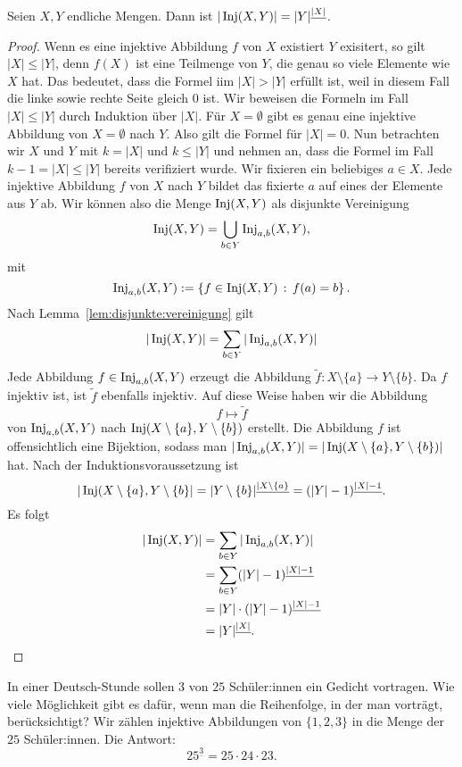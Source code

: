 \begin{thm} \label{thm:inj:abbildungen}
	Seien $X,Y$ endliche Mengen. Dann ist $|\operatorname{Inj}(X,Y) | = |Y|^{\underline{|X|}}$. 
\end{thm} 
\begin{proof} 
	Wenn es eine injektive Abbildung $f$ von $X$ existiert $Y$ exisitert, so gilt $|X| \le |Y|$, denn $f(X)$ ist eine Teilmenge von $Y$, die genau so viele Elemente wie $X$ hat. Das bedeutet, dass die Formel iim $|X| > |Y|$ erfüllt ist, weil in diesem Fall die linke sowie rechte Seite gleich $0$ ist. Wir beweisen die Formeln im Fall $|X| \le |Y|$ durch Induktion über $|X|$. Für $X = \emptyset$ gibt es genau eine injektive Abbildung von $X= \emptyset$ nach $Y$. Also gilt die Formel für $|X|=0$. 
	Nun betrachten wir $X$ und $Y$ mit $k=|X|$ und $k \le |Y|$ und nehmen an, dass die Formel im Fall $k-1=|X| \le |Y|$ bereits verifiziert wurde. Wir fixieren ein beliebiges $a \in X$. Jede injektive Abbildung $f$ von $X$ nach $Y$ bildet das fixierte $a$ auf eines der Elemente aus $Y$ ab. Wir können also die Menge $\operatorname{Inj}(X,Y)$ als disjunkte Vereinigung 
	\[
			\operatorname{Inj}(X,Y) = \bigcup_{b \in Y} \operatorname{Inj}_{a,b}(X,Y),
	\]
	mit 
	\[
		\operatorname{Inj}_{a,b} (X,Y) := \left\{  f \in \operatorname{Inj}(X,Y) \,:\, f(a) = b \right\}. 
	\]
	Nach Lemma~\ref{lem:disjunkte:vereinigung} gilt 
	\[
			|\operatorname{Inj}(X,Y)| = \sum_{b \in Y} |\operatorname{Inj}_{a,b}(X,Y)|
	\]
	Jede Abbildung $f  \in \operatorname{Inj}_{a,b}(X,Y)$ erzeugt die Abbildung $\tilde{f} : X \setminus \{a\} \to Y \setminus \{b\}$. Da $f$ injektiv ist, ist $\tilde{f}$ ebenfalls injektiv. Auf diese Weise haben wir die Abbildung 
	\[
				f \mapsto \tilde{f} 
	\]
	von $\operatorname{Inj}_{a,b}(X,Y)$ nach $\operatorname{Inj}(X \setminus \{a\}, Y \setminus \{b\})$ erstellt. Die Abbildung $f$ ist offensichtlich eine Bijektion, sodass man $|\operatorname{Inj}_{a,b}(X,Y)| = |\operatorname{Inj}(X \setminus \{a\},Y \setminus \{b\})|$ hat. Nach der Induktionsvoraussetzung ist 
	\[
		|\operatorname{Inj}(X \setminus \{a\}, Y \setminus \{b\} | = |Y \setminus \{b\}|^{\underline{|X \setminus \{a\}}} = (|Y| -1)^{\underline{|X|-1}}.
	\] 
	Es folgt 
	\begin{align*}
	|\operatorname{Inj}(X,Y)| & = \sum_{b \in Y} |\operatorname{Inj}_{a,b}(X,Y)| 
		\\ & = \sum_{b \in Y} (|Y| -1)^{\underline{|X|-1}} 
		\\ & = |Y| \cdot (|Y| -1)^{\underline{|X|-1}}
		\\ & = |Y|^{\underline{|X|}}. 
	\end{align*}
\end{proof} 

\begin{bsp}
		In einer Deutsch-Stunde sollen  $3$ von $25$ Schüler:innen ein Gedicht vortragen. Wie viele Möglichkeit gibt es dafür, wenn man die Reihenfolge, in der man vorträgt, berücksichtigt? Wir zählen injektive Abbildungen von $\{1,2,3\}$ in die Menge der $25$ Schüler:innen. Die Antwort: 
		\[
			25^{\underline{3}} = 25 \cdot 24 \cdot 23. 
		\]
\end{bsp} 

